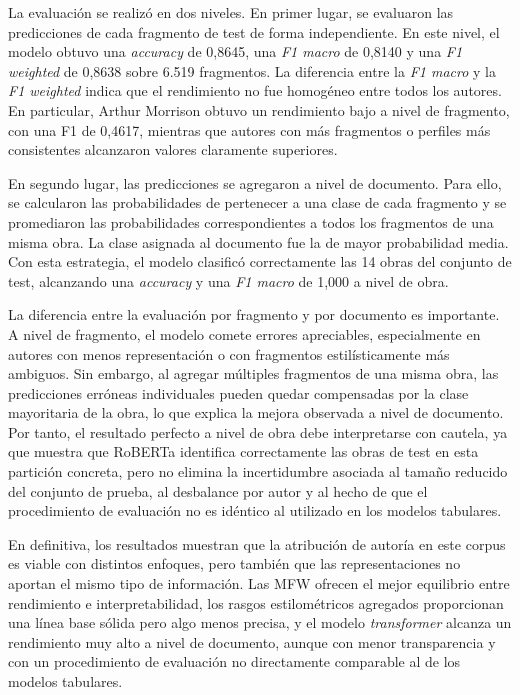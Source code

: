 \documentclass[IB]{TFUOC}%
\begin{document}
La evaluación se realizó en dos niveles. En primer lugar, se evaluaron las predicciones de cada fragmento de test de forma independiente. En este nivel, el modelo obtuvo una \textit{accuracy} de 0,8645, una \textit{F1 macro} de 0,8140 y una \textit{F1 weighted} de 0,8638 sobre 6.519 fragmentos. La diferencia entre la \textit{F1 macro} y la \textit{F1 weighted} indica que el rendimiento no fue homogéneo entre todos los autores. En particular, Arthur Morrison obtuvo un rendimiento bajo a nivel de fragmento, con una F1 de 0,4617, mientras que autores con más fragmentos o perfiles más consistentes alcanzaron valores claramente superiores.

En segundo lugar, las predicciones se agregaron a nivel de documento. Para ello, se calcularon las probabilidades de pertenecer a una clase de cada fragmento y se promediaron las probabilidades correspondientes a todos los fragmentos de una misma obra. La clase asignada al documento fue la de mayor probabilidad media. Con esta estrategia, el modelo clasificó correctamente las 14 obras del conjunto de test, alcanzando una \textit{accuracy} y una \textit{F1 macro} de 1,000 a nivel de obra.

La diferencia entre la evaluación por fragmento y por documento es importante. A nivel de fragmento, el modelo comete errores apreciables, especialmente en autores con menos representación o con fragmentos estilísticamente más ambiguos. Sin embargo, al agregar múltiples fragmentos de una misma obra, las predicciones erróneas individuales pueden quedar compensadas por la clase mayoritaria de la obra, lo que explica la mejora observada a nivel de documento. Por tanto, el resultado perfecto a nivel de obra debe interpretarse con cautela, ya que muestra que RoBERTa identifica correctamente las obras de test en esta partición concreta, pero no elimina la incertidumbre asociada al tamaño reducido del conjunto de prueba, al desbalance por autor y al hecho de que el procedimiento de evaluación no es idéntico al utilizado en los modelos tabulares.

En definitiva, los resultados muestran que la atribución de autoría en este corpus es viable con distintos enfoques, pero también que las representaciones no aportan el mismo tipo de información. Las MFW ofrecen el mejor equilibrio entre rendimiento e interpretabilidad, los rasgos estilométricos agregados proporcionan una línea base sólida pero algo menos precisa, y el modelo \textit{transformer} alcanza un rendimiento muy alto a nivel de documento, aunque con menor transparencia y con un procedimiento de evaluación no directamente comparable al de los modelos tabulares.
\end{document}
